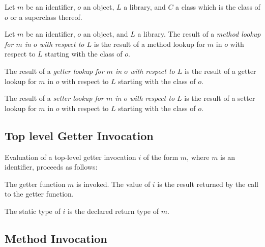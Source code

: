 \documentclass[makeidx]{article}
\begin{document}
{{{}

\LMHash{}%
Let $m$ be an identifier, $o$ an object, $L$ a library,
and $C$ a class which is the class of $o$ or a superclass thereof.


\def\LookupDefinition#1{%
The result of a
{\em {#1} lookup for $m$ in $o$ with respect to $L$}
is the result of a
{#1} lookup for $m$ in $o$ with respect to $L$
starting with the class of $o$.
}

\LMHash{}%
Let $m$ be an identifier, $o$ an object, and $L$ a library.
\LookupDefinition{method}
\LookupDefinition{getter}
\LookupDefinition{setter}

} %





\subsection{Top level Getter Invocation}

\LMHash{}%
Evaluation of a top-level getter invocation $i$ of the form $m$, where $m$ is an identifier, proceeds as follows:

\LMHash{}%
The getter function $m$ is invoked.
The value of $i$ is the result returned by the call to the getter function.

\LMHash{}%
The static type of $i$ is the declared return type of $m$.


\subsection{Method Invocation}

}
\end{document}
